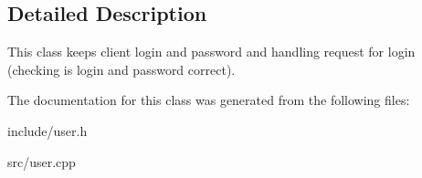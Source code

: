 \subsection{Detailed Description}
This class keeps client login and password and handling request for login (checking is login and password correct). 

The documentation for this class was generated from the following files\+:\begin{DoxyCompactItemize}
\item 
include/user.\+h\item 
src/user.\+cpp\end{DoxyCompactItemize}
